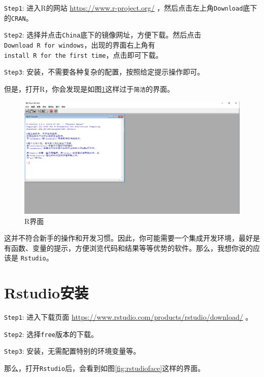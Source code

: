 \documentclass[]{ctexbook}
\begin{document}
\texttt{Step1}: 进入R的网站 \url{https://www.r-project.org/}
，然后点击左上角\texttt{Download}底下的\texttt{CRAN}。

\texttt{Step2}:
选择并点击\texttt{China}底下的镜像网址，方便下载。然后点击\texttt{Download\ R\ for\ windows}，出现的界面右上角有\texttt{install\ R\ for\ the\ first\ time}，点击即可下载。

\texttt{Step3}: 安装，不需要各种复杂的配置，按照给定提示操作即可。

但是，打开R，你会发现是如图\ref{fig:rface}这样过于\texttt{简洁}的界面。

\begin{figure}

{\centering \includegraphics[width=0.8\linewidth]{img/R} 

}

\caption{R界面}\label{fig:rface}
\end{figure}

这并不符合新手的操作和开发习惯。因此，你可能需要一个集成开发环境，最好是有函数、变量的提示，方便浏览代码和结果等等优势的软件。那么，我想你说的应该是
\texttt{Rstudio}。

\section{Rstudio安装}\label{Rstudioinstall}

\texttt{Step1}: 进入下载页面
\url{https://www.rstudio.com/products/rstudio/download/} 。

\texttt{Step2}: 选择\texttt{free}版本的下载。

\texttt{Step3}: 安装，无需配置特别的环境变量等。

那么，打开\texttt{Rstudio}后，会看到如图\ref{fig:rstudioface}这样的界面。
\end{document}
